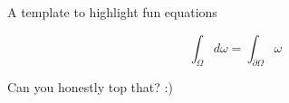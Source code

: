 \documentclass{beamer}
\begin{document}
\begin{frame}

\LARGE
\begin{center}
A template to highlight fun equations

\end{center}


\huge
\begin{equation*}
    \int_\Omega d \omega = \int_{\partial \Omega} \omega
\end{equation*}

\vfill

\small
Can you honestly top that? :)

\end{frame}
\end{document}
